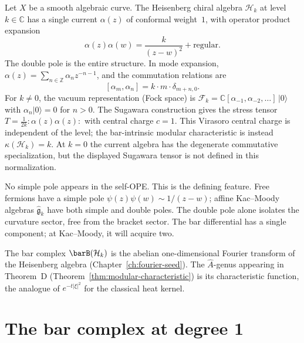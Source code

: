 Let $X$ be a smooth algebraic curve. The Heisenberg chiral algebra
$\mathcal{H}_k$ at level $k \in \mathbb{C}$ has a single current
$\alpha(z)$ of conformal weight~$1$, with operator product expansion
\begin{equation}\label{eq:frame-heisenberg-ope}
\alpha(z)\alpha(w) = \frac{k}{(z-w)^2} + \text{regular}.
\end{equation}
The double pole is the entire structure. In mode expansion,
$\alpha(z) = \sum_{n \in \mathbb{Z}} \alpha_n z^{-n-1}$, and the
commutation relations are
\begin{equation}\label{eq:frame-heisenberg-modes}
[\alpha_m, \alpha_n] = k \cdot m \cdot \delta_{m+n,0}.
\end{equation}
For $k \neq 0$, the vacuum representation (Fock space) is
$\mathcal{F}_k = \mathbb{C}[\alpha_{-1}, \alpha_{-2}, \ldots]\,|0\rangle$
with $\alpha_n|0\rangle = 0$ for $n > 0$. The Sugawara construction gives
the stress tensor $T = \frac{1}{2k}:\!\alpha(z)\alpha(z)\!:$ with central
charge $c = 1$. This Virasoro central charge is independent of the
level; the bar-intrinsic modular characteristic is instead
$\kappa(\mathcal{H}_k)=k$. At $k=0$ the current algebra has the
degenerate commutative specialization, but the displayed Sugawara
tensor is not defined in this normalization.

No simple pole appears in the self-OPE. This is the defining feature.
Free fermions have a simple pole $\psi(z)\psi(w) \sim 1/(z-w)$; affine
Kac--Moody algebras $\widehat{\mathfrak{g}}_k$ have both simple and
double poles. The double pole alone isolates the curvature sector,
free from the bracket sector. The bar differential has a single
component; at Kac--Moody, it will acquire two.

\begin{remark}\label{rem:frame-fourier-identification}
The bar complex $\barB(\mathcal{H}_k)$ is the abelian one-dimensional
Fourier transform of the Heisenberg algebra
(Chapter~\ref{ch:fourier-seed}). The $\hat{A}$-genus appearing in
Theorem~D (Theorem~\ref{thm:modular-characteristic}) is its
characteristic function, the analogue of $e^{-t|\xi|^2}$ for the
classical heat kernel.
\end{remark}

\section{The bar complex at degree 1}\label{sec:frame-bar-deg1}

